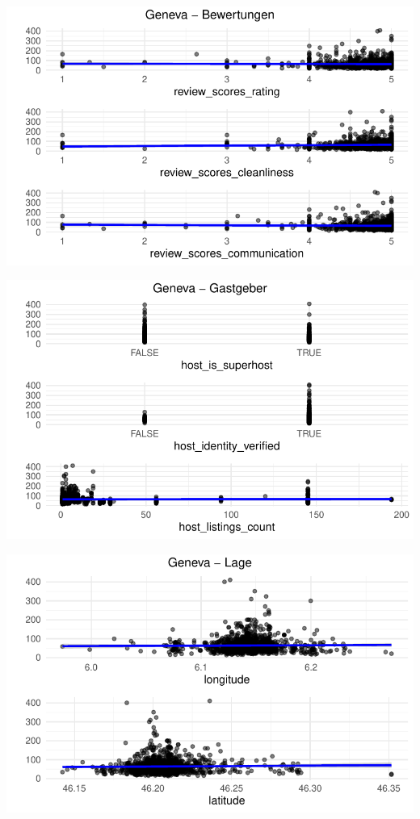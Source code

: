 \documentclass[
  journal,
]{IEEEtran}%
\begin{document}
\includegraphics{main_files/figure-pdf/unnamed-chunk-12-7.pdf}

\includegraphics{main_files/figure-pdf/unnamed-chunk-12-8.pdf}

\includegraphics{main_files/figure-pdf/unnamed-chunk-12-9.pdf}
\end{document}
